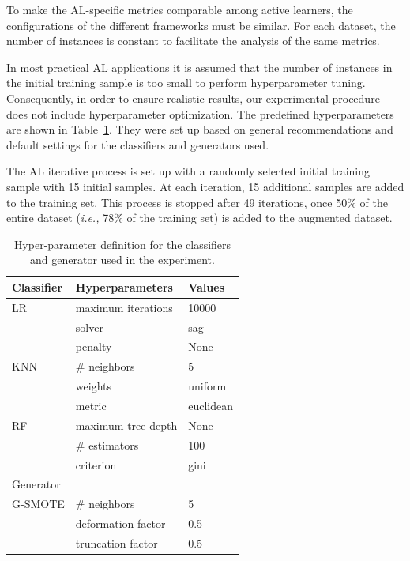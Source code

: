 To make the AL-specific metrics comparable among active learners, the
configurations of the different frameworks must be similar. For each dataset,
the number of instances is constant to facilitate the analysis of the same
metrics. 

In most practical AL applications it is assumed that the number of instances 
in the initial training sample is too small to perform hyperparameter tuning.
Consequently, in order to ensure realistic results, our experimental procedure
does not include hyperparameter optimization. The predefined hyperparameters
are shown in Table~\ref{tab:grid_al_generator}. They were set up based on general
recommendations and default settings for the classifiers and generators used.

The AL iterative process is set up with a randomly selected initial training
sample with 15 initial samples. At each iteration, 15 additional samples are
added to the training set. This process is stopped after 49 iterations, once
50\% of the entire dataset (\textit{i.e.,} 78\% of the training set) is added
to the augmented dataset.

\begin{table}
	\centering
	\begin{tabular}{lll}
		\toprule
		Classifier & Hyperparameters      & Values             \\
		\midrule
		LR         & maximum iterations   & 10000              \\
		           & solver               & sag                \\
                   & penalty              & None               \\
		KNN        & \# neighbors         & 5                  \\
                   & weights              & uniform            \\
                   & metric               & euclidean          \\
		RF         & maximum tree depth   & None               \\
		           & \# estimators        & 100                \\
                   & criterion            & gini               \\
		\toprule
		Generator  &                      &                    \\
		\midrule
		G-SMOTE    & \# neighbors         & 5                  \\
                   & deformation factor   & 0.5                \\
                   & truncation factor    & 0.5                \\
		\bottomrule
	\end{tabular}
    \caption{Hyper-parameter definition for the classifiers and
    generator used in the experiment.}~\label{tab:grid_al_generator}
\end{table}

